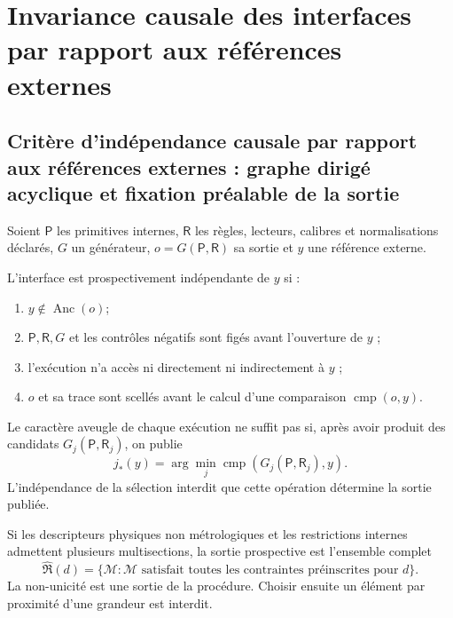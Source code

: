 \chapter{Invariance causale des interfaces par rapport aux références externes}
\label{chap:independencia-prospectiva}

\section{Critère d'indépendance causale par rapport aux références externes : graphe dirigé acyclique et fixation préalable de la sortie}
\label{sec:definiciones-independencia-prospectiva}

Soient \(\mathsf P\) les primitives internes, \(\mathsf R\) les règles,
lecteurs, calibres et normalisations déclarés, \(G\) un générateur,
\(o=G(\mathsf P,\mathsf R)\) sa sortie et \(y\) une référence externe.

\begin{definition}
\label{def:interfaz-prospectivamente-independiente}
L'interface est prospectivement indépendante de \(y\) si :
\begin{enumerate}
 \item \(y\notin\operatorname{Anc}(o)\);
 \item \(\mathsf P,\mathsf R,G\) et les contrôles négatifs sont figés avant
 l'ouverture de \(y\) ;
 \item l'exécution n'a accès ni directement ni indirectement à \(y\) ;
 \item \(o\) et sa trace sont scellés avant le calcul d'une comparaison
 \(\operatorname{cmp}(o,y)\).
\end{enumerate}
\end{definition}

\begin{definition}
\label{def:independencia-seleccion}
Le caractère aveugle de chaque exécution ne suffit pas si, après avoir produit des candidats
\(G_j(\mathsf P,\mathsf R_j)\), on publie
\[
 j_\ast(y)=\arg\min_j
 \operatorname{cmp}\!\left(G_j(\mathsf P,\mathsf R_j),y\right).
\]
L'indépendance de la sélection interdit que cette opération détermine la sortie
publiée.
\end{definition}

\begin{definition}
\label{def:prediccion-multivaluada}
Si les descripteurs physiques non métrologiques et les restrictions internes
admettent plusieurs multisections, la sortie prospective est l'ensemble complet
\[
 \widehat{\mathfrak R}(d)
 =\{\mathcal M:\mathcal M\text{ satisfait toutes les contraintes
 préinscrites pour }d\}.
\]
La non-unicité est une sortie de la procédure. Choisir ensuite un élément
par proximité d'une grandeur est interdit.
\end{definition}

